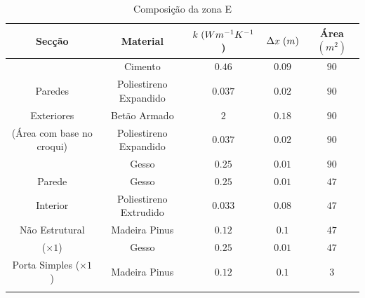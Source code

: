 \documentclass[12pt, a4paper]{article}
\begin{document}
\begin{table}[htpb]
	\begin{center}
		\begin{tabular}{c c c c c}
			\toprule{}
			Secção                     & Material               & $ k \hspace{1mm} (Wm^{-1}K^{-1}$) & $ \Delta x \hspace{1mm} (m)$ & Área $(m^2) $ \\
				\midrule{}

			\multirow{5}{*}{}          & Cimento                & $0.46$                            & $0.09$                       & $90$          \\
				\cline{2-5}
			Paredes                    & Poliestireno Expandido & $0.037$                           & $0.02$                       & $90$          \\
				\cline{2-5}
			Exteriores                 & Betão Armado           & $2$                               & $0.18$                       & $90$          \\
				\cline{2-5}
			(Área com base no croqui)  & Poliestireno Expandido & $0.037$                           & $0.02$                       & $90$          \\
				\cline{2-5}
			                           & Gesso                  & $0.25$                            & $0.01$                       & $90$          \\
				\midrule{}

			Parede \multirow{4}{*}{}   & Gesso                  & $0.25$                            & $0.01$                       & $47$          \\
				\cline{2-5}
			Interior                   & Poliestireno Extrudido & $0.033$                           & $0.08$                       & $47$          \\
				\cline{2-5}
			Não Estrutural             & Madeira Pinus          & $0.12$                            & $0.1$                        & $47$          \\
				\cline{2-5}
			($\times1$)                & Gesso                  & $0.25$                            & $0.01$                       & $47$          \\
				\midrule{}

			Porta Simples ($\times 1$) & Madeira Pinus          & $0.12$                            & $0.1$                        & $3$           \\
			\bottomrule{}
		\end{tabular}
	\end{center}
	\caption{Composição da zona E}\label{tab:zona_e}
\end{table}
\end{document}
